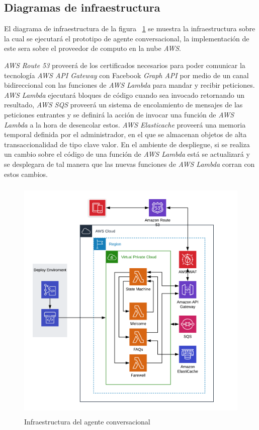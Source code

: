     \subsection{Diagramas de infraestructura}
    
        El diagrama de infraestructura de la figura ~\ref{fig:infraestructura} se muestra la infraestructura sobre la cual se ejecutará el prototipo de agente conversacional, la implementación de este sera sobre el proveedor de computo en la nube \textit{AWS}.
        
        \textit{AWS Route 53} proveerá de los certificados necesarios para poder comunicar la tecnología \textit{AWS API Gateway} con Facebook \textit{Graph API} por medio de un canal bidireccional con las funciones de \textit{AWS Lambda} para mandar y recibir peticiones. \textit{AWS Lambda} ejecutará bloques de código cuando sea invocado retornando un resultado, \textit{AWS SQS} proveerá un sistema de encolamiento de mensajes de las peticiones entrantes y se definirá la acción de invocar una función de \textit{AWS Lambda} a la hora de desencolar estos. \textit{AWS Elasticache} proveerá una memoria temporal definida por el administrador, en el que se almacenan objetos de alta transaccionalidad de tipo clave valor. En el ambiente de despliegue, si se realiza un cambio sobre el código de una función de \textit{AWS Lambda} está se actualizará y se desplegara de tal manera que las nuevas funciones de \textit{AWS Lambda} corran con estos cambios.
        \begin{figure}[H]
             \centering
             \includegraphics[height=12cm, width=16.5cm]{Latex/Classes/Imagenes/Diagrama_de_infraestructura.png}
             \caption{Infraestructura del agente conversacional}
             \label{fig:infraestructura}
        \end{figure}
        
